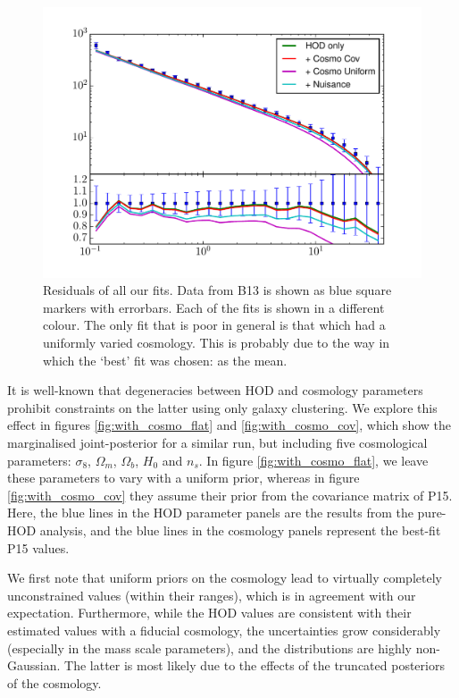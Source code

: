 \documentclass[5p]{elsarticle}
\begin{document}
 \begin{figure}
\centering
\includegraphics[width=\linewidth]{figures/residuals.pdf} 
\caption[Residuals for all fits in example application]{Residuals of all our fits. Data from B13 is shown as blue square markers with errorbars. Each of the fits is shown in a different colour. The only fit that is poor in general is that which had a uniformly varied cosmology. This is probably due to the way in which the `best' fit was chosen: as the mean.}
\label{fig:residuals}
\end{figure}

It is well-known that degeneracies between HOD and cosmology parameters prohibit constraints on the latter using only galaxy clustering. We explore this effect in figures \ref{fig:with_cosmo_flat} and \ref{fig:with_cosmo_cov}, which show the marginalised joint-posterior for a similar run, but including five cosmological parameters: $\sigma_8$, $\Omega_m$, $\Omega_b$, $H_0$ and $n_s$. In figure \ref{fig:with_cosmo_flat}, we leave these parameters to vary with a uniform prior, whereas in figure \ref{fig:with_cosmo_cov} they assume their prior from the covariance matrix of P15. Here, the blue lines in the HOD parameter panels are the results from the pure-HOD analysis, and the blue lines in the cosmology panels represent the best-fit P15 values.

We first note that uniform priors on the cosmology lead to virtually completely unconstrained values (within their ranges), which is in agreement with our expectation. Furthermore, while the HOD values are consistent with their estimated values with a fiducial cosmology, the uncertainties grow considerably (especially in the mass scale parameters), and the distributions are highly non-Gaussian. The latter is most likely due to the effects of the truncated posteriors of the cosmology. 
\end{document}
